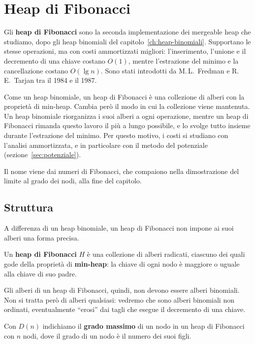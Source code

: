 \chapter{Heap di Fibonacci}\label{ch:heap-fibonacci}
Gli \textbf{heap di Fibonacci} sono la seconda implementazione dei mergeable heap che studiamo, dopo gli heap binomiali del capitolo~\ref{ch:heap-binomiali}. Supportano le stesse operazioni, ma con costi ammortizzati migliori: l'inserimento, l'unione e il decremento di una chiave costano $O(1)$, mentre l'estrazione del minimo e la cancellazione costano $O(\lg n)$. Sono stati introdotti da M.\,L.~Fredman e R.\,E.~Tarjan tra il 1984 e il 1987.

Come un heap binomiale, un heap di Fibonacci è una collezione di alberi con la proprietà di min-heap. Cambia però il modo in cui la collezione viene mantenuta. Un heap binomiale riorganizza i suoi alberi a ogni operazione, mentre un heap di Fibonacci rimanda questo lavoro il più a lungo possibile, e lo svolge tutto insieme durante l'estrazione del minimo. Per questo motivo, i costi si studiano con l'analisi ammortizzata, e in particolare con il metodo del potenziale (sezione~\ref{sec:potenziale}).

Il nome viene dai numeri di Fibonacci, che compaiono nella dimostrazione del limite al grado dei nodi, alla fine del capitolo.

\section{Struttura}\label{sec:hf-struttura}
A differenza di un heap binomiale, un heap di Fibonacci non impone ai suoi alberi una forma precisa.

\begin{definizione}\label{def:heap-fibonacci}
Un \textbf{heap di Fibonacci} $H$ è una collezione di alberi radicati, ciascuno dei quali gode della proprietà di \textbf{min-heap}: la chiave di ogni nodo è maggiore o uguale alla chiave di suo padre.
\end{definizione}

Gli alberi di un heap di Fibonacci, quindi, non devono essere alberi binomiali. Non si tratta però di alberi qualsiasi: vedremo che sono alberi binomiali non ordinati, eventualmente ``erosi'' dai tagli che esegue il decremento di una chiave.

Con $D(n)$ indichiamo il \textbf{grado massimo} di un nodo in un heap di Fibonacci con $n$ nodi, dove il grado di un nodo è il numero dei suoi figli.

